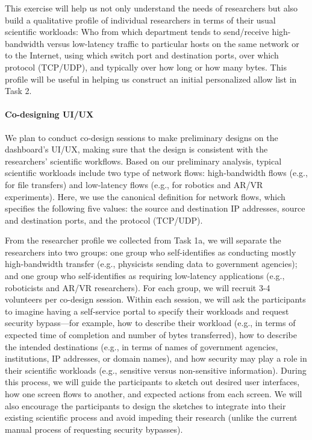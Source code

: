 This exercise will help us not only understand the needs of researchers but also build a qualitative profile of individual researchers in terms of their usual scientific workloads: Who from which department tends to send/receive high-bandwidth versus low-latency traffic to particular hosts on the same network or to the Internet, using which switch port and destination ports, over which protocol (TCP/UDP), and typically over how long or how many bytes. This profile will be useful in helping us construct an initial personalized allow list in Task 2.


\paragraph{Co-designing UI/UX}
We plan to conduct co-design sessions to make preliminary designs on the dashboard's UI/UX, making sure that the design is consistent with the researchers' scientific workflows.
Based on our preliminary analysis, typical scientific workloads include two type of network flows: high-bandwidth flows (e.g., for file transfers) and low-latency flows (e.g., for robotics and AR/VR experiments). Here, we use the canonical definition for network flows, which specifies the following five values: the source and destination IP addresses, source and destination ports, and the protocol (TCP/UDP).

From the researcher profile we collected from Task 1a, we will separate the researchers into two groups: one group who self-identifies as conducting mostly high-bandwidth transfer (e.g., physicists sending data to government agencies); and one group who self-identifies as requiring low-latency applications (e.g., roboticists and AR/VR researchers). For each group, we will recruit 3-4 volunteers per co-design session. Within each session, we will ask the participants to imagine having a self-service portal to specify their workloads and request security bypass---for example, how to describe their workload (e.g., in terms of expected time of completion and number of bytes transferred), how to describe the intended destinations (e.g., in terms of names of government agencies, institutions, IP addresses, or domain names), and how security may play a role in their scientific workloads (e.g., sensitive versus non-sensitive information). During this process, we will guide the participants to sketch out desired user interfaces, how one screen flows to another, and expected actions from each screen.  We will also encourage the participants to design the sketches to integrate into their existing scientific process and avoid impeding their research (unlike the current manual process of requesting security bypasses).

